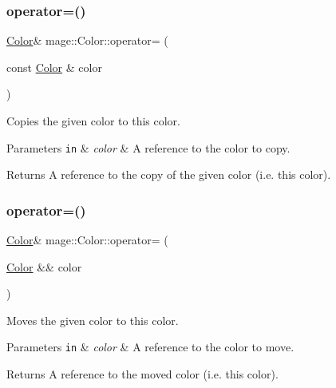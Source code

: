 \subsubsection{\texorpdfstring{operator=()}{operator=()}\hspace{0.1cm}{\footnotesize\ttfamily [1/2]}}
{\footnotesize\ttfamily \hyperlink{structmage_1_1_color}{Color}\& mage\+::\+Color\+::operator= (\begin{DoxyParamCaption}\item[{const \hyperlink{structmage_1_1_color}{Color} \&}]{color }\end{DoxyParamCaption})}

Copies the given color to this color.


\begin{DoxyParams}[1]{Parameters}
\mbox{\tt in}  & {\em color} & A reference to the color to copy. \\
\hline
\end{DoxyParams}
\begin{DoxyReturn}{Returns}
A reference to the copy of the given color (i.\+e. this color). 
\end{DoxyReturn}
\hypertarget{structmage_1_1_color_afe64cf3cf65b5812ac35674917abb12c}{}\label{structmage_1_1_color_afe64cf3cf65b5812ac35674917abb12c} 
\subsubsection{\texorpdfstring{operator=()}{operator=()}\hspace{0.1cm}{\footnotesize\ttfamily [2/2]}}
{\footnotesize\ttfamily \hyperlink{structmage_1_1_color}{Color}\& mage\+::\+Color\+::operator= (\begin{DoxyParamCaption}\item[{\hyperlink{structmage_1_1_color}{Color} \&\&}]{color }\end{DoxyParamCaption})}

Moves the given color to this color.


\begin{DoxyParams}[1]{Parameters}
\mbox{\tt in}  & {\em color} & A reference to the color to move. \\
\hline
\end{DoxyParams}
\begin{DoxyReturn}{Returns}
A reference to the moved color (i.\+e. this color). 
\end{DoxyReturn}

